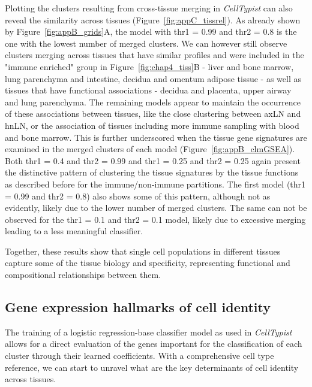 Plotting the clusters resulting from cross-tissue merging in \textit{CellTypist} can also reveal the similarity across tissues (Figure~\ref{fig:appC_tissrel}). As already shown by Figure~\ref{fig:appB_grids}A, the model with thr1 = 0.99 and thr2 = 0.8 is the one with the lowest number of merged clusters. We can however still observe clusters merging across tissues that have similar profiles and were included in the "immune enriched" group in Figure~\ref{fig:chap4_tiss}B - liver and bone marrow, lung parenchyma and intestine, decidua and omentum adipose tissue - as well as tissues that have functional associations - decidua and placenta, upper airway and lung parenchyma. The remaining models appear to maintain the occurrence of these associations between tissues, like the close clustering between axLN and hnLN, or the association of tissues including more immune sampling with blood and bone marrow. This is further underscored when the tissue gene signatures are examined in the merged clusters of each model (Figure~\ref{fig:appB_clmGSEA}). Both thr1 = 0.4 and thr2 = 0.99 and thr1 = 0.25 and thr2 = 0.25 again present the distinctive pattern of clustering the tissue signatures by the tissue functions as described before for the immune/non-immune partitions. The first model (thr1 = 0.99 and thr2 = 0.8) also shows some of this pattern, although not as evidently, likely due to the lower number of merged clusters. The same can not be observed for the thr1 = 0.1 and thr2 = 0.1 model, likely due to excessive merging leading to a less meaningful classifier.

Together, these results show that single cell populations in different tissues capture some of the tissue biology and specificity, representing functional and compositional relationships between them.


\subsection{Gene expression hallmarks of cell identity}
\label{section_genes}
The training of a logistic regression-base classifier model as used in \textit{CellTypist} allows for a direct evaluation of the genes important for the classification of each cluster through their learned coefficients. With a comprehensive cell type reference, we can start to unravel what are the key determinants of cell identity across tissues.

